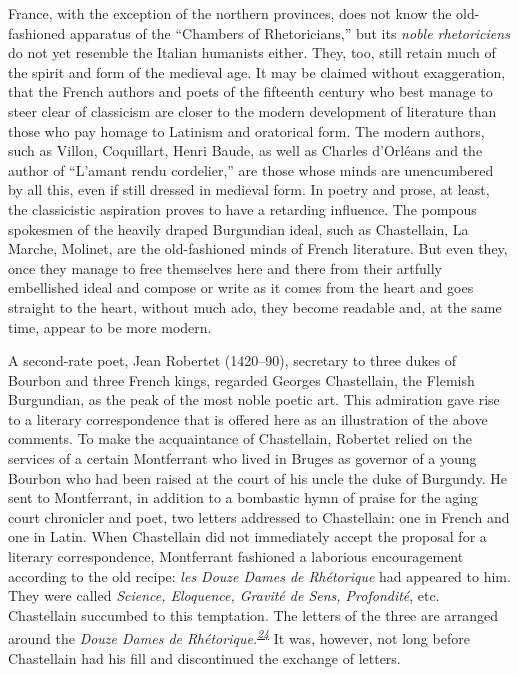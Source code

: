France, with the exception of the northern provinces, does not know the
old-fashioned apparatus of the ``Chambers of Rhetoricians,'' but its
\emph{noble rhetoriciens} do not yet resemble the Italian humanists
either. They, too, still retain much of the spirit and form of the
medieval age. It may be claimed without exaggeration, that the French
authors and poets of the fifteenth century who best manage to steer
clear of classicism are closer to the modern development of literature
than those who pay homage to Latinism and oratorical form. The modern
authors, such as Villon, Coquillart, Henri Baude, as well as Charles
d'Orléans and the author of ``L'amant rendu cordelier,'' are those whose
minds are unencumbered by all this, even if still dressed in medieval
form. In poetry and prose, at least, the classicistic aspiration proves
to have a retarding influence. The pompous spokesmen of the heavily
draped Burgundian ideal, such as Chastellain, La Marche, Molinet, are
the old-fashioned minds of French literature. But even they, once they
manage to free themselves here and there from their artfully embellished
ideal and compose or write as it comes from the heart and goes straight
to the heart, without much ado, they become readable and, at the same
time, appear to be more modern.

A second-rate poet, Jean Robertet (1420--90), secretary to three dukes
of Bourbon and three French kings, regarded Georges Chastellain, the
Flemish Burgundian, as the peak of the most noble poetic art. This
admiration gave rise to a literary correspondence
\protect\hypertarget{22_Chapter_Fourteen__THE_COMING_OF.xhtmlux5cux23page_390}{}{}that
is offered here as an illustration of the above comments. To make the
acquaintance of Chastellain, Robertet relied on the services of a
certain Montferrant who lived in Bruges as governor of a young Bourbon
who had been raised at the court of his uncle the duke of Burgundy. He
sent to Montferrant, in addition to a bombastic hymn of praise for the
aging court chronicler and poet, two letters addressed to Chastellain:
one in French and one in Latin. When Chastellain did not immediately
accept the proposal for a literary correspondence, Montferrant fashioned
a laborious encouragement according to the old recipe: \emph{les Douze
Dames de Rhétorique} had appeared to him. They were called
\emph{Science, Eloquence, Gravité de Sens, Profondité}, etc. Chastellain
succumbed to this temptation. The letters of the three are arranged
around the \emph{Douze Dames de
Rhétorique.\textsuperscript{\protect\hypertarget{22_Chapter_Fourteen__THE_COMING_OF.xhtmlux5cux23id_76}{\protect\hyperlink{23_NOTES.xhtmlux5cux23id_77}{24}}}}
It was, however, not long before Chastellain had his fill and
discontinued the exchange of letters.

